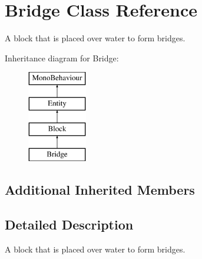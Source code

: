 \hypertarget{class_bridge}{}\section{Bridge Class Reference}
\label{class_bridge}


A block that is placed over water to form bridges.  


Inheritance diagram for Bridge\+:\begin{figure}[H]
\begin{center}
\leavevmode
\includegraphics[height=4.000000cm]{class_bridge}
\end{center}
\end{figure}
\subsection*{Additional Inherited Members}


\subsection{Detailed Description}
A block that is placed over water to form bridges. 


